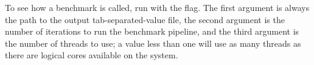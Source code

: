 \documentclass{InsightArticle}
\begin{document}
To see how a benchmark is called, run  with the  flag.
The first argument is always the path to the output tab-separated-value file,
the second argument is the number of iterations to run the benchmark pipeline,
and the third argument is the number of threads to use; a value less than one
will use as many threads as there are logical cores available on the system.

%
%



\end{document}

